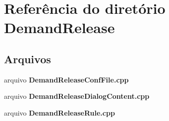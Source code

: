 \section{Referência do diretório Demand\+Release}
\label{dir_dc79a574e2ca7cf25b9675da452bcb77}
\subsection*{Arquivos}
\begin{DoxyCompactItemize}
\item 
arquivo {\bf Demand\+Release\+Conf\+File.\+cpp}
\item 
arquivo {\bf Demand\+Release\+Dialog\+Content.\+cpp}
\item 
arquivo {\bf Demand\+Release\+Rule.\+cpp}
\end{DoxyCompactItemize}
